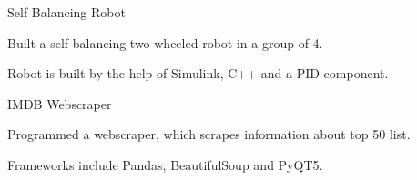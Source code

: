 
\begin{cventries}
  \cventry
    {} %
    {Self Balancing Robot} %
    {} %
    {} %
    {
      \begin{cvitems} %
      	\item {Built a self balancing two-wheeled robot in a group of 4.}
		    \item {Robot is built by the help of Simulink, C++ and a PID component.}
      \end{cvitems}
    }

  \cventry
    {} %
    {IMDB Webscraper} %
    {} %
    {} %
    {
      \begin{cvitems} %
      	\item {Programmed a webscraper, which scrapes information about top 50 list.}
		    \item {Frameworks include Pandas, BeautifulSoup and PyQT5.}
      \end{cvitems}
    }
\end{cventries}